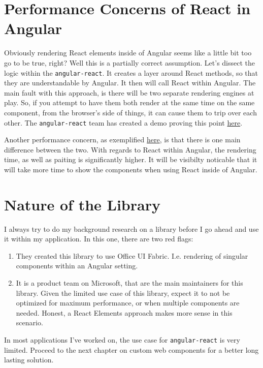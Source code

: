 \section{Performance Concerns of React in Angular}
Obviously rendering React elements inside of Angular seems like a little bit too go to be true, right? Well this is a partially correct assumption. Let's dissect the logic within the \lstinline{angular-react}. It creates a layer around React methods, so that they are understandable by Angular. It then will call React within Angular. The main fault with this approach, is there will be two separate rendering engines at play. So, if you attempt to have them both render at the same time on the same component, from the browser's side of things, it can cause them to trip over each other. The \lstinline{angular-react} team has created a demo proving this point \href{https://microsoft.github.io/angular-react/performance/mixed}{here}.

Another performance concern, as exemplified \href{https://microsoft.github.io/angular-react/performance/profiles}{here}, is that there is one main difference between the two. With regards to React within Angular, the rendering time, as well as paiting is significantly higher. It will be visibilty noticable that it will take more time to show the components when using React inside of Angular.

\section{Nature of the Library}
I always try to do my background research on a library before I go ahead and use it within my application. In this one, there are two red flags: 
\begin{enumerate}
  \item They created this library to use Office UI Fabric. I.e. rendering of singular components within an Angular setting. 
  \item It is a product team on Microsoft, that are the main maintainers for this library. Given the limited use case of this library, expect it to not be optimized for maximum performance, or when multiple components are needed. Honest, a React Elements approach makes more sense in this scenario. 
\end{enumerate}

In most applications I've worked on, the use case for \lstinline{angular-react} is very limited. Proceed to the next chapter on custom web components for a better long lasting solution.